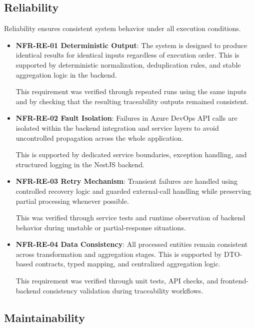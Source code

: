 % 
\subsection{Reliability}

Reliability ensures consistent system behavior under all execution conditions.

\begin{itemize}

\item \textbf{NFR-RE-01  Deterministic Output}:  
The system is designed to produce identical results for identical inputs regardless of execution order. This is supported by deterministic normalization, deduplication rules, and stable aggregation logic in the backend.

This requirement was verified through repeated runs using the same inputs and by checking that the resulting traceability outputs remained consistent.

\item \textbf{NFR-RE-02  Fault Isolation}:  
Failures in Azure DevOps API calls are isolated within the backend integration and service layers to avoid uncontrolled propagation across the whole application.

This is supported by dedicated service boundaries, exception handling, and structured logging in the NestJS backend.

\item \textbf{NFR-RE-03  Retry Mechanism}:  
Transient failures are handled using controlled recovery logic and guarded external-call handling while preserving partial processing whenever possible.

This was verified through service tests and runtime observation of backend behavior during unstable or partial-response situations.

\item \textbf{NFR-RE-04  Data Consistency}:  
All processed entities remain consistent across transformation and aggregation stages. This is supported by DTO-based contracts, typed mapping, and centralized aggregation logic.

This requirement was verified through unit tests, API checks, and frontend-backend consistency validation during traceability workflows.

\end{itemize}

% 
\subsection{Maintainability}

